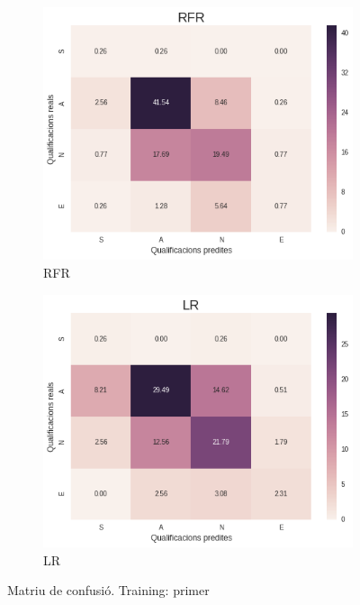 \documentclass[12pt,a4paper,catalan]{article}
\begin{document}
\begin{figure}[h]
\centering
\begin{subfigure}{.48\textwidth}
  \centering
  \includegraphics[width=\linewidth]{img/heatmap_rfr_primer_segon.png}
  \caption{RFR}
\end{subfigure}
\begin{subfigure}{.48\textwidth}
  \centering
  \includegraphics[width=\linewidth]{img/heatmap_lr_primer_segon.png}
  \caption{LR}
\end{subfigure}
\caption{Matriu de confusió. Training: primer}
\end{figure}
\end{document}
